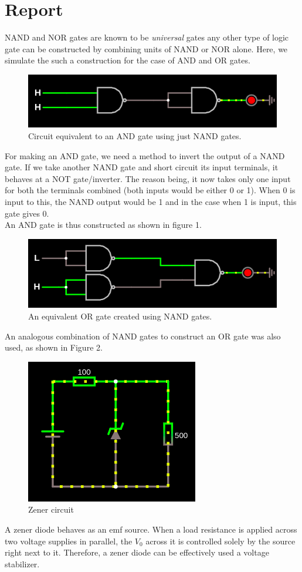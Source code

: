 \documentclass{article}
\begin{document}
	\section*{Report}
	NAND and NOR gates are known to be \textit{universal} gates \textemdash any other type of logic gate can be constructed by combining units of NAND or NOR alone. Here, we simulate the such a construction for the case of AND and OR gates.
	\begin{figure}[H]
		\includegraphics[width=\textwidth]{AND.png}
		\caption{Circuit equivalent to an AND gate using just NAND gates.}
	\end{figure}
	For making an AND gate, we need a method to invert the output of a NAND gate. If we take another NAND gate and short circuit its input terminals, it behaves at a NOT gate/inverter. The reason being, it now takes only one input for both the terminals combined (both inputs would be either 0 or 1). When 0 is input to this, the NAND output would be 1 and in the case when 1 is input, this gate gives 0.\\
	
	 An AND gate is thus constructed as shown in figure 1.
	\begin{figure}[H]
		\includegraphics[width=\textwidth]{OR.png}
		\caption{An equivalent OR gate created using NAND gates.}
	\end{figure}

An analogous combination of NAND gates to construct an OR gate was also used, as shown in Figure 2.
	\begin{figure}[H]
		\centering
		\includegraphics{zener_circuit}
		\caption{Zener circuit}
	\end{figure}
A zener diode behaves as an emf source. When a load resistance is applied across two voltage supplies in parallel, the $V_0$ across it is controlled solely by the source right next to it. Therefore, a zener diode can be effectively used a voltage stabilizer.
\end{document}
